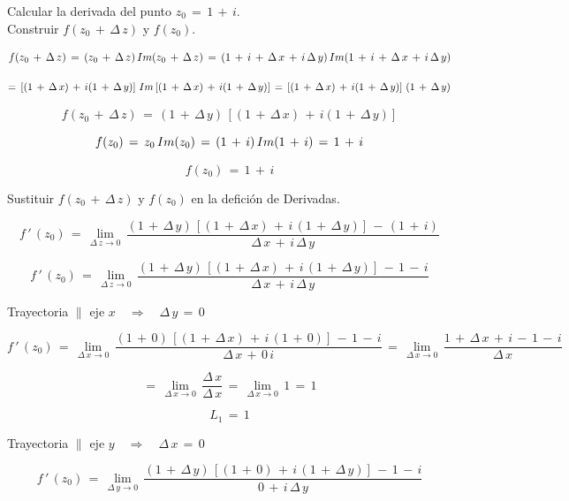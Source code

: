 \documentclass[a4paper,11pt,openany]{book}
\begin{document}
\textcolor{ao(english)}{} Calcular la derivada del punto $z_{0}\,=\,1\,+\,i$.\\

\textcolor{ao(english)}{} Construir $f(z_{0}\,+\,\Delta\,z)$ y $f(z_{0})$.

$$f(z_{0}\,+\,\Delta\,z)\,=\,(z_{0}\,+\,\Delta\,z)\,\mathnormal{Im}(z_{0}\,+\,\Delta\,z)\,=\,(1\,+\,i\,+\,\Delta\,x\,+\,i\,\Delta\,y)\,\mathnormal{Im}(1\,+\,i\,+\,\Delta\,x\,+\,i\,\Delta\,y)$$

$$=\,\left[(1\,+\,\Delta\,x)\,+\,i(1\,+\,\Delta\,y)\right]\,\mathnormal{Im}\left[(1\,+\,\Delta\,x)\,+\,i(1\,+\,\Delta\,y)\right]\,=\,\left[(1\,+\,\Delta\,x)\,+\,i(1\,+\,\Delta\,y)\right]\,(1\,+\,\Delta\,y)$$

$$f(z_{0}\,+\,\Delta\,z)\,=\,(1\,+\,\Delta\,y)\,\left[(1\,+\,\Delta\,x)\,+\,i(1\,+\,\Delta\,y)\right]$$

$$f(z_{0})\,=\,z_{0}\,\mathnormal{Im}(z_{0})\,=\,(1\,+\,i)\,\mathnormal{Im}(1\,+\,i)\,=\,1\,+\,i$$

$$f(z_{0})\,=\,1\,+\,i$$

\textcolor{ao(english)}{} Sustituir  $f(z_{0}\,+\,\Delta\,z)$ y $f(z_{0})$ en la defición de Derivadas.

$$f\,'\,(z_{0})\,=\,\displaystyle\lim_{\Delta\,z \to 0}\,\dfrac{(1\,+\,\Delta\,y)\,\left[(1\,+\,\Delta\,x)\,+\,i\,(1\,+\,\Delta\,y)\right]\,-\,(1\,+\,i)}{\Delta\,x\,+\,i\,\Delta\,y}$$

$$f\,'\,(z_{0})\,=\,\displaystyle\lim_{\Delta\,z \to 0}\,\dfrac{(1\,+\,\Delta\,y)\,\left[(1\,+\,\Delta\,x)\,+\,i\,(1\,+\,\Delta\,y)\right]\,-\,1\,-\,i}{\Delta\,x\,+\,i\,\Delta\,y}$$

\textcolor{ao(english)}{} Trayectoria $\parallel$ eje $x \quad\Rightarrow\quad \Delta\,y\,=\,0$

$$f\,'\,(z_{0})\,=\,\displaystyle\lim_{\Delta\,x \to 0}\,\dfrac{(1\,+\,0)\,\left[(1\,+\,\Delta\,x)\,+\,i\,(1\,+\,0)\right]\,-\,1\,-\,i}{\Delta\,x\,+\,0\,i}\,=\,\displaystyle\lim_{\Delta\,x \to 0}\,\dfrac{1\,+\,\Delta\,x\,+\,i\,-\,1\,-\,i}{\Delta\,x}$$

$$=\,\displaystyle\lim_{\Delta\,x \to 0}\,\dfrac{\Delta\,x}{\Delta\,x}\,=\,\displaystyle\lim_{\Delta\,x \to 0}\,1\,=\,1$$

$$L_{1}\,=\,1$$

\newpage

\textcolor{ao(english)}{} Trayectoria $\parallel$ eje $y \quad\Rightarrow\quad \Delta\,x\,=\,0$

$$f\,'\,(z_{0})\,=\,\displaystyle\lim_{\Delta\,y \to 0}\,\dfrac{(1\,+\,\Delta\,y)\,\left[(1\,+\,0)\,+\,i\,(1\,+\,\Delta\,y)\right]\,-\,1\,-\,i}{0\,+\,i\,\Delta\,y}$$
\end{document}
